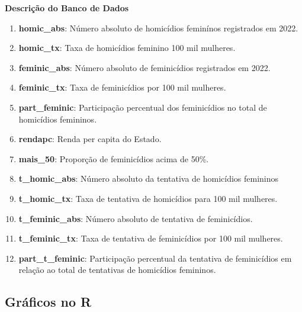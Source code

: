 \documentclass[
  letterpaper,
  DIV=11,
  numbers=noendperiod]{scrreprt}
\begin{document}
\begin{tcolorbox}[enhanced jigsaw, colframe=quarto-callout-note-color-frame, opacityback=0, breakable, leftrule=.75mm, toprule=.15mm, arc=.35mm, rightrule=.15mm, bottomrule=.15mm, left=2mm, colback=white]
\begin{minipage}[t]{5.5mm}
\textcolor{quarto-callout-note-color}{\faInfo}
\end{minipage}%
\begin{minipage}[t]{\textwidth - 5.5mm}

\vspace{-3mm}\textbf{Descrição do Banco de Dados}\vspace{3mm}

\begin{enumerate}
\def\labelenumi{\arabic{enumi}.}
\item
  \textbf{homic\_abs}: Número absoluto de homicídios feminínos
  registrados em 2022.
\item
  \textbf{homic\_tx}: Taxa de homicídios feminino 100 mil mulheres.
\item
  \textbf{feminic\_abs}: Número absoluto de feminicídios registrados em
  2022.
\item
  \textbf{feminic\_tx}: Taxa de feminicídios por 100 mil mulheres.
\item
  \textbf{part\_feminic}: Participação percentual dos feminicídios no
  total de homicídios femininos.
\item
  \textbf{rendapc}: Renda per capita do Estado.
\item
  \textbf{mais\_50}: Proporção de feminicídios acima de 50\%.
\item
  \textbf{t\_homic\_abs}: Número absoluto da tentativa de homicídios
  femininos
\item
  \textbf{t\_homic\_tx}: Taxa de tentativa de homicídios para 100 mil
  mulheres.
\item
  \textbf{t\_feminic\_abs}: Número absoluto de tentativa de
  feminicídios.
\item
  \textbf{t\_feminic\_tx}: Taxa de tentativa de feminicídios por 100 mil
  mulheres.
\item
  \textbf{part\_t\_feminic}: Participação percentual da tentativa de
  feminicídios em relação ao total de tentativas de homicídios
  femininos.
\end{enumerate}

\end{minipage}%
\end{tcolorbox}

\subsection{Gráficos no R}\label{gruxe1ficos-no-r}
\end{document}
